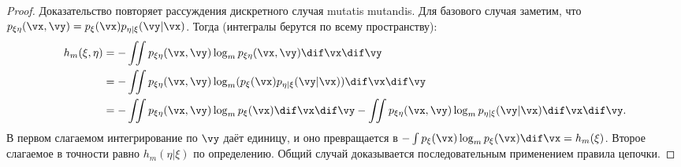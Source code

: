 \begin{proof}
	Доказательство повторяет рассуждения дискретного случая mutatis mutandis. Для базового случая заметим, что $p_{\xi\eta}(\vx,\vy) = p_\xi(\vx) p_{\eta|\xi}(\vy|\vx)$. Тогда (интегралы берутся по всему пространству):
	\begin{align*}
		h_m(\xi,\eta) &= -\iint p_{\xi\eta}(\vx,\vy) \log_m p_{\xi\eta}(\vx,\vy) \dif\vx \dif\vy \\
		&= -\iint p_{\xi\eta}(\vx,\vy) \log_m (p_\xi(\vx) p_{\eta|\xi}(\vy|\vx)) \dif\vx \dif\vy \\
		&= -\iint p_{\xi\eta}(\vx,\vy) \log_m p_\xi(\vx) \dif\vx \dif\vy - \iint p_{\xi\eta}(\vx,\vy) \log_m p_{\eta|\xi}(\vy|\vx) \dif\vx \dif\vy.
	\end{align*}
	В первом слагаемом интегрирование по $\vy$ даёт единицу, и оно превращается в $-\int p_\xi(\vx) \log_m p_\xi(\vx) \dif\vx = h_m(\xi)$. Второе слагаемое в точности равно $h_m(\eta|\xi)$ по определению. Общий случай доказывается последовательным применением правила цепочки.
\end{proof}

